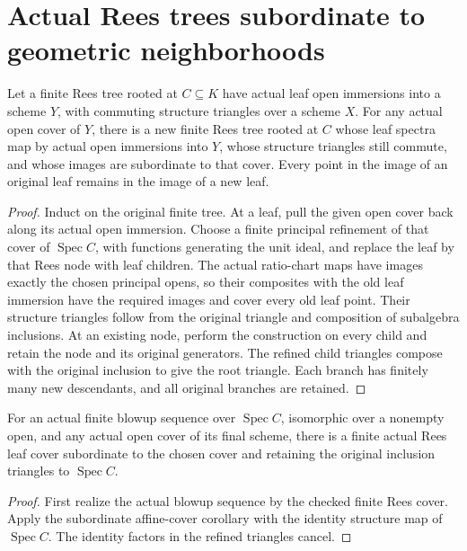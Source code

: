 \section{Actual Rees trees subordinate to geometric neighborhoods}

\begin{lemma}\label{lem:sc0-rees-cover-refinement}
\leanok
{}
Let a finite Rees tree rooted at $C\subseteq K$ have actual leaf open
immersions into a scheme $Y$, with commuting structure triangles over a scheme
$X$. For any actual open cover of $Y$, there is a new finite Rees tree rooted at
$C$ whose leaf spectra map by actual open immersions into $Y$, whose structure
triangles still commute, and whose images are subordinate to that cover. Every
point in the image of an original leaf remains in the image of a new leaf.
\end{lemma}
\begin{proof}
Induct on the original finite tree. At a leaf, pull the given open cover back
along its actual open immersion. Choose a finite principal refinement of that
cover of $\operatorname{Spec}C$, with functions generating the unit ideal, and
replace the leaf by that Rees node with leaf children. The actual ratio-chart
maps have images exactly the chosen principal opens, so their composites with
the old leaf immersion have the required images and cover every old leaf
point. Their structure triangles follow from the original triangle and
composition of subalgebra inclusions. At an existing node, perform the
construction on every child and retain the node and its original generators.
The refined child triangles compose with the original inclusion to give the
root triangle. Each branch has finitely many new descendants, and all
original branches are retained.
\end{proof}

\begin{corollary}\label{cor:sc0-actual-rees-cover-subordinate}
\leanok
{}
For an actual finite blowup sequence over $\operatorname{Spec}C$, isomorphic
over a nonempty open, and any actual open cover of its final scheme, there is
a finite actual Rees leaf cover subordinate to the chosen cover and retaining
the original inclusion triangles to $\operatorname{Spec}C$.
\end{corollary}
\begin{proof}
First realize the actual blowup sequence by the checked finite Rees cover.
Apply the subordinate affine-cover corollary with the identity structure map
of $\operatorname{Spec}C$. The identity factors in the refined triangles cancel.
\end{proof}

